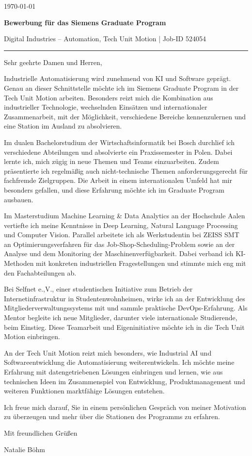 \documentclass[11pt,a4paper]{article}
\newcommand{\Briefdatum}{\today}
\begin{document}
\color{CVText}

{\raggedleft \Briefdatum\par}
\vspace{5mm}
{\large\bfseries\textcolor{CVPrimary}{Bewerbung für das Siemens Graduate Program}}\par
{\small Digital Industries -- Automation, Tech Unit Motion | Job-ID 524054}\par
{\color{CVPrimary}\rule{\linewidth}{0.6pt}}\par
\vspace{1mm}

Sehr geehrte Damen und Herren,

Industrielle Automatisierung wird zunehmend von KI und Software geprägt. Genau an dieser Schnittstelle möchte ich im Siemens Graduate Program in der Tech Unit Motion arbeiten. Besonders reizt mich die Kombination aus industrieller Technologie, wechselnden Einsätzen und internationaler Zusammenarbeit, mit der Möglichkeit, verschiedene Bereiche kennenzulernen und eine Station im Ausland zu absolvieren.

Im dualen Bachelorstudium der Wirtschaftsinformatik bei Bosch durchlief ich verschiedene Abteilungen und absolvierte ein Praxissemester in Polen. Dabei lernte ich, mich zügig in neue Themen und Teams einzuarbeiten. Zudem präsentierte ich regelmäßig auch nicht-technische Themen anforderungsgerecht für fachfremde Zielgruppen. Die Arbeit in einem internationalen Umfeld hat mir besonders gefallen, und diese Erfahrung möchte ich im Graduate Program ausbauen.

Im Masterstudium Machine Learning \& Data Analytics an der Hochschule Aalen vertiefte ich meine Kenntnisse in Deep Learning, Natural Language Processing und Computer Vision. Parallel arbeitete ich als Werkstudentin bei ZEISS SMT an Optimierungsverfahren für das Job-Shop-Scheduling-Problem sowie an der Analyse und dem Monitoring der Maschinenverfügbarkeit. Dabei verband ich KI-Methoden mit konkreten industriellen Fragestellungen und stimmte mich eng mit den Fachabteilungen ab.

Bei Selfnet e.,V., einer studentischen Initiative zum Betrieb der Internetinfrastruktur in Studentenwohnheimen, wirke ich an der Entwicklung des Mitgliederverwaltungssystems mit und sammle praktische DevOps-Erfahrung. Als Mentor begleite ich neue Mitglieder, darunter viele internationale Studierende, beim Einstieg. Diese Teamarbeit und Eigeninitiative möchte ich in die Tech Unit Motion einbringen.

An der Tech Unit Motion reizt mich besonders, wie Industrial AI und Softwareentwicklung die Automatisierung weiterentwickeln. Ich möchte meine Erfahrung mit datengetriebenen Lösungen einbringen und lernen, wie aus technischen Ideen im Zusammenspiel von Entwicklung, Produktmanagement und weiteren Funktionen marktfähige Lösungen entstehen.

Ich freue mich darauf, Sie in einem persönlichen Gespräch von meiner Motivation zu überzeugen und mehr über die Stationen des Programms zu erfahren.

Mit freundlichen Grüßen

\vspace{6mm}
Natalie Böhm
\end{document}
